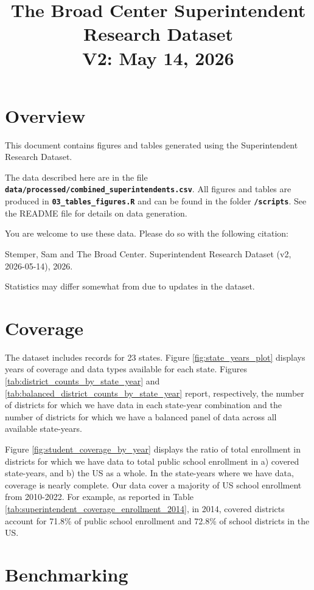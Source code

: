 \documentclass[12pt]{article}
\title{The Broad Center Superintendent Research Dataset \\  V2: May 14, 2026}
\date{}
\begin{document}
\maketitle
\section{Overview}
This document contains figures and tables generated using the Superintendent Research Dataset. 

The data described here are in the file \textbf{\texttt{data/processed/combined\_superintendents.csv}}. All figures and tables are produced in \textbf{\texttt{03\_tables\_figures.R}} and can be found in the folder \textbf{\texttt{/scripts}}. See the README file for details on data generation. 

You are welcome to use these data. Please do so with the following citation: 

\noindent Stemper, Sam and The Broad Center. Superintendent Research Dataset (v2, 2026-05-14), 2026. 

Statistics may differ somewhat from \citet{stemper} due to updates in the dataset. 

\section{Coverage}
The dataset includes records for 23 states. Figure \ref{fig:state_years_plot} displays years of coverage and data types available for each state. Figures \ref{tab:district_counts_by_state_year} and \ref{tab:balanced_district_counts_by_state_year} report, respectively, the number of districts for which we have data in each state-year combination and the number of districts for which we have a balanced panel of data across all available state-years. 

Figure \ref{fig:student_coverage_by_year} displays the ratio of total enrollment in districts for which we have data to total public school enrollment in a) covered state-years, and b) the US as a whole. In the state-years where we have data, coverage is nearly complete. Our data cover a majority of US school enrollment from 2010-2022. For example, as reported in Table \ref{tab:superintendent_coverage_enrollment_2014}, in 2014, covered districts account for 71.8\% of public school enrollment and 72.8\% of school districts in the US. 

\section{Benchmarking}
\end{document}
